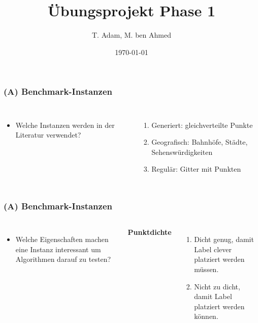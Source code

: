 \documentclass[aspectratio=169]{beamer}
\title[Übungsprojekt Phase 1]{Übungsprojekt Phase 1} %
\author{T. Adam, M. ben Ahmed} %
\institute[UOS] %
{

Universität Osnabrück \\ %

\medskip
\textit{Algorithm Engineering} %


}
\date{\today} %
\begin{document}
\begin{frame}
\titlepage %
\end{frame}





\begin{frame}
	\frametitle{(A) Benchmark-Instanzen}
	\begin{columns}[c] %
	
	\begin{itemize}
		\item Welche Instanzen werden in der Literatur verwendet? \pause
		
	\end{itemize}
	
	\begin{enumerate}
	\item Generiert: gleichverteilte Punkte\pause
	\item Geografisch: Bahnhöfe, Städte, Sehenswürdigkeiten\pause
	\item Regulär: Gitter mit Punkten
	\end{enumerate}
	

	\end{columns}
	\end{frame}

\begin{frame}
	\frametitle{(A) Benchmark-Instanzen}
	\begin{columns}[c] %
	
	\begin{itemize}
		\item Welche Eigenschaften machen eine Instanz interessant um Algorithmen darauf zu testen? \pause
	\end{itemize}
	
	\textbf{Punktdichte}
	\begin{enumerate}

	\item Dicht genug, damit Label clever platziert werden müssen. \pause
	\item Nicht zu dicht, damit Label platziert werden können. 
	\end{enumerate}
	

	\end{columns}
	\end{frame}
\end{document}
